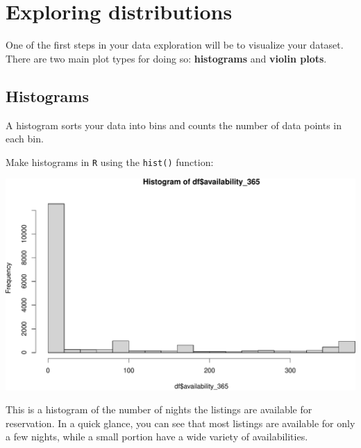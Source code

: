 \documentclass[
]{book}
\newenvironment{Shaded}{\begin{snugshade}}{\end{snugshade}}
\newcommand{\DecValTok}[1]{\textcolor[rgb]{0.00,0.00,0.81}{#1}}
\newcommand{\KeywordTok}[1]{\textcolor[rgb]{0.13,0.29,0.53}{\textbf{#1}}}
\newcommand{\NormalTok}[1]{#1}
\newcommand{\OperatorTok}[1]{\textcolor[rgb]{0.81,0.36,0.00}{\textbf{#1}}}
\begin{document}
\hypertarget{exploring-distributions}{%
\section*{Exploring distributions}\label{exploring-distributions}}

One of the first steps in your data exploration will be to visualize your dataset. There are two main plot types for doing so: \textbf{histograms} and \textbf{violin plots}.

\hypertarget{histograms}{%
\subsection*{Histograms}\label{histograms}}

A histogram sorts your data into bins and counts the number of data points in each bin.

Make histograms in \texttt{R} using the \texttt{hist()} function:

\begin{Shaded}
\end{Shaded}

\includegraphics{figures/unnamed-chunk-211-1.pdf}

This is a histogram of the number of nights the listings are available for reservation. In a quick glance, you can see that most listings are available for only a few nights, while a small portion have a wide variety of availabilities.
\end{document}
